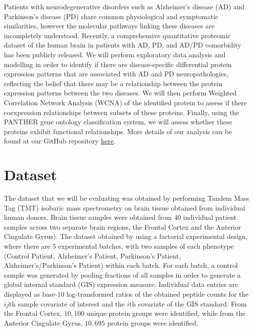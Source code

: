 Patients with neurodegenerative disorders such as Alzheimer’s disease (AD) and Parkinson’s disease (PD) share common physiological and symptomatic similarities, however the molecular pathways linking these diseases are incompletely understood. Recently, a comprehensive quantitative proteomic dataset of the human brain in patients with AD, PD, and AD/PD comorbidity has been publicly released. We will perform exploratory data analysis and modelling in order to identify if there are disease-specific differential protein expression patterns that are associated with AD and PD neuropathologies, reflecting the belief that there may be a relationship between the protein expression patterns between the two diseases. We will then perform Weighted Correlation Network Analysis (WCNA) of the identified protein to assess if there coexpression relationships between subsets of these proteins. Finally, using the PANTHER gene ontology classification system, we will assess whether these proteins exhibit functional relationships. More details of our analysis can be found at our GitHub repository \href{https://github.com/jtcanty/Linear-Modelling-and-Network-Analysis-of-the-Human-Brain-Proteome}{here}. 

\pagebreak

\tableofcontents

\pagebreak

\section{Dataset}
\label{sec:dataset}

The dataset\cite{proteome} that we will be evaluating was obtained by performing Tandem Mass Tag (TMT) isobaric mass spectrometry on brain tissue obtained from individual human donors. Brain tissue samples were obtained from $40$ individual patient samples across two separate brain regions, the Frontal Cortex and the Anterior Cingulate Gyrus). The dataset obtained by using a factorial experimental design, where there are $5$ experimental batches, with two samples of each phenotype (Control Patient, Alzheimer’s Patient, Parkinson’s Patient, Alzheimer’s/Parkinson’s Patient) within each batch. For each batch, a control sample was generated by pooling fractions of all samples in order to generate a global internal standard (GIS) expression measure. Individual data entries are displayed as base-$10$ log-transformed ratios of the obtained peptide counts for the $ij$th sample covariate of interest and the $i$th covariate of the GIS standard. From the Frontal Cortex, $10,100$ unique protein groups were identified, while from the Anterior Cingulate Gyrus, $10,695$ protein groups were identified.


